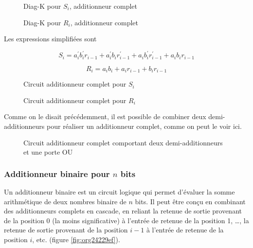 \documentclass[11pt]{article}
\begin{document}
\begin{figure}[htbp]
\centering

\caption{\label{fig:org71d8cb7}Diag-K pour \(S_i\), additionneur complet}
\end{figure}


\begin{figure}[htbp]
\centering

\caption{\label{fig:orge1b1521}Diag-K pour \(R_i\), additionneur complet}
\end{figure}


Les expressions simplifiées sont 

$$ S_{i} = a_i^\prime b_i^\prime r_{i-1} + a_i^\prime b_i
r_{i-1}^\prime + a_i b_i^\prime r_{i-1}^\prime + a_i b_i r_{i-1} $$

$$ R_{i} = a_i b_i + a_i r_{i-1} + b_i r_{i-1} $$

\begin{figure}[htbp]
\centering

\caption{\label{fig:orgf04b18e}Circuit additionneur complet pour \(S_i\)}
\end{figure}



\begin{figure}[htbp]
\centering

\caption{\label{fig:org548b9e6}Circuit additionneur complet pour \(R_i\)}
\end{figure}


Comme on le disait précédemment, il est possible de combiner deux
demi-additionneurs pour réaliser un additionneur complet, comme on
peut le voir ici.


\begin{figure}[htbp]
\centering

\caption{\label{fig:orgc18c101}Circuit additionneur complet comportant deux demi-additionneurs et une porte OU}
\end{figure}

\subsubsection{Additionneur binaire pour \(n\) bits}
\label{sec:org2f783ed}

Un additionneur binaire est un circuit logique qui permet d'évaluer la
somme arithmétique de deux nombres binaire de \(n\) bits. Il peut être
conçu en combinant des additionneurs complets en cascade, en reliant
la retenue de sortie provenant de la position 0 (la moins
significative) à l'entrée de retenue de la position 1, \ldots{}, la retenue
de sortie provenant de la position \(i-1\) à l'entrée de retenue de la
position \(i\), etc. (figure \ref{fig:org24229ef}).
\end{document}

